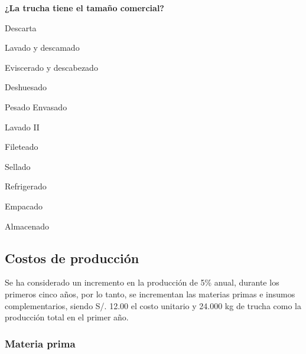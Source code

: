 \documentclass[
  stu,
  floatsintext,
  longtable,
  a4paper,
  nolmodern,
  notxfonts,
  notimes,
  colorlinks=true,linkcolor=blue,citecolor=blue,urlcolor=blue]{apa7}
\begin{document}
\hspace{0pt}\textbf{¿La trucha tiene el tamaño comercial?}

\hspace{0pt}Descarta

\hspace{0pt}Lavado y descamado

\hspace{0pt}Eviscerado y descabezado

\hspace{0pt}Deshuesado

\hspace{0pt}Pesado Envasado

\hspace{0pt}Lavado II

\hspace{0pt}Fileteado

\hspace{0pt}Sellado

\hspace{0pt}Refrigerado

\hspace{0pt}Empacado

\hspace{0pt}Almacenado

\subsection{Costos de producción}\label{costos-de-producciuxf3n}

Se ha considerado un incremento en la producción de 5\% anual, durante
los primeros cinco años, por lo tanto, se incrementan las materias
primas e insumos complementarios, siendo S/. 12.00 el costo unitario y
24.000 kg de trucha como la producción total en el primer año.

\subsubsection{Materia prima}\label{materia-prima}
\end{document}
